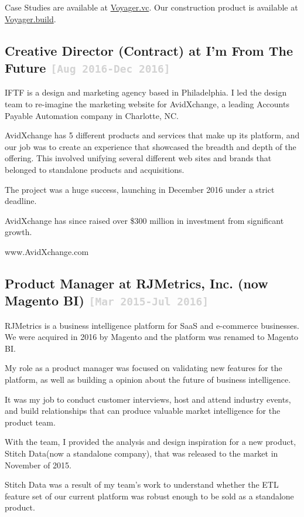 \documentclass{tufte-handout}
\newcommand{\shstandout}[1]{\textbf{\textcolor{BurntOrange}{#1}}}
\newcommand{\shyears}[1]{\small{\texttt{\textcolor{LightGray}{#1}}}}
\begin{document}
Case Studies are available at \href{http://www.Voyager.vc}{Voyager.vc}.
Our construction product is available at \href{http://www.Voyager.build}{Voyager.build}.


\subsection{\textbf{Creative Director (Contract)} at \shstandout{I'm From The Future} \shyears{[Aug 2016-Dec 2016]}}

IFTF is a design and marketing agency based in Philadelphia. I led the design team to re-imagine the marketing website for AvidXchange, a leading Accounts Payable Automation company in Charlotte, NC.

AvidXchange has 5 different products and services that make up its platform, and our job was to create an experience that showcased the breadth and depth of the offering. This involved unifying several different web sites and brands that belonged to standalone products and acquisitions.

The project was a huge success, launching in December 2016 under a strict deadline.

AvidXchange has since raised over \$300 million in investment from significant growth.

www.AvidXchange.com

\subsection{\textbf{Product Manager} at \shstandout{RJMetrics, Inc. (now Magento BI)} \shyears{[Mar 2015-Jul 2016]}}

RJMetrics is a business intelligence platform for SaaS and e-commerce businesses. We were acquired in 2016 by Magento and the platform was renamed to Magento BI.

My role as a product manager was focused on validating new features for the platform, as well as building a opinion about the future of business intelligence.

It was my job to conduct customer interviews, host and attend industry events, and build relationships that can produce valuable market intelligence for the product team.

With the team, I provided the analysis and design inspiration for a new product, Stitch Data(now a standalone company), that was released to the market in November of 2015.

Stitch Data was a result of my team's work to understand whether the ETL feature set of our current platform was robust enough to be sold as a standalone product.
\end{document}

